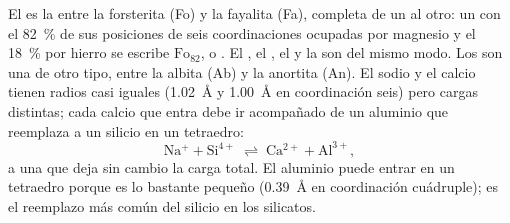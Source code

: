 El  es la  entre la forsterita  (Fo) y la fayalita  (Fa), completa
de un  al otro: un  con el \qty{82}{\percent} de sus posiciones de seis coordinaciones
ocupadas por magnesio y el \qty{18}{\percent} por hierro se escribe $\text{Fo}_{82}$, o
. El , el , el  y la  son  del mismo
modo. Los   son una  de otro tipo, entre la albita  (Ab) y la
anortita  (An). El sodio y el calcio tienen radios casi iguales (\qty{1.02}{\angstrom} y
\qty{1.00}{\angstrom} en coordinación seis) pero cargas distintas; cada calcio que entra debe ir acompañado de un
aluminio que reemplaza a un silicio en un tetraedro:
\[
  \mathrm{Na^{+}} + \mathrm{Si^{4+}} \;\rightleftharpoons\; \mathrm{Ca^{2+}} + \mathrm{Al^{3+}},
\]
a una  que deja sin cambio la carga total. El aluminio puede entrar en un tetraedro
porque es lo bastante pequeño (\qty{0.39}{\angstrom} en coordinación cuádruple); es el reemplazo más común
del silicio en los silicatos.

